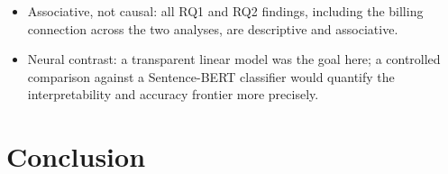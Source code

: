 \documentclass[11pt,a4paper,DIV=12]{scrartcl}
\begin{document}
\begin{itemize}[leftmargin=1.4em]
  without further checks. Subscription Boxes has only 641 distinct items, so
  its aspect frequencies can be influenced by a few popular boxes; the two
  categories also differ in average review length, which is why mention rates
  are also reported per 100 words as a sensitivity check.
  \item Associative, not causal: all RQ1 and RQ2 findings, including
  the billing connection across the two analyses, are descriptive and
  associative.
  \item Neural contrast: a transparent linear model was the goal here; a
  controlled comparison against a Sentence-BERT classifier
  \citep{reimers2019sentencebert} would quantify the interpretability and accuracy
  frontier more precisely.
\end{itemize}

\section{Conclusion}
\label{sec:conclusion}
\end{document}
